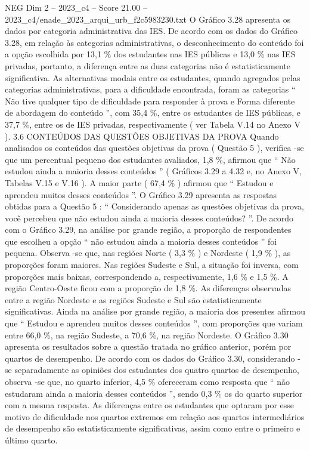 \begin{textsample}{NEG Dim 2 – 2023\_c4 – Score 21.00 – 2023\_c4/enade\_2023\_arqui\_urb\_f2c5983230.txt}
O Gráfico 3.28 apresenta os dados por categoria administrativa das IES.
De acordo com os dados do Gráfico 3.28, em relação às categorias administrativas, o desconhecimento do conteúdo foi a opção escolhida por 13,1 \% dos estudantes nas IES públicas e 13,0 \% nas IES privadas, portanto, a diferença entre as duas categorias não é estatisticamente significativa.
As alternativas modais entre os estudantes, quando agregados pelas categorias administrativas, para a dificuldade encontrada, foram as categorias “ Não tive qualquer tipo de dificuldade para responder à prova e Forma diferente de abordagem do conteúdo ”, com 35,4 \%, entre os estudantes de IES públicas, e 37,7 \%, entre os de IES privadas, respectivamente ( ver Tabela V.14 no Anexo V ). 3.6 CONTEÚDOS DAS QUESTÕES OBJETIVAS DA PROVA Quando analisados os conteúdos das questões objetivas da prova ( Questão 5 ), verifica -se que um percentual pequeno dos estudantes avaliados, 1,8 \%, afirmou que “ Não estudou ainda a maioria desses conteúdos ” ( Gráficos 3.29 a 4.32 e, no Anexo V, Tabelas V.15 e V.16 ).
A maior parte ( 67,4 \% ) afirmou que “ Estudou e aprendeu muitos desses conteúdos ”.
O Gráfico 3.29 apresenta as respostas obtidas para a Questão 5 : “ Considerando apenas as questões objetivas da prova, você percebeu que não estudou ainda a maioria desses conteúdos? ”.
De acordo com o Gráfico 3.29, na análise por grande região, a proporção de respondentes que escolheu a opção “ não estudou ainda a maioria desses conteúdos ” foi pequena.
Observa -se que, nas regiões Norte ( 3,3 \% ) e Nordeste ( 1,9 \% ), as proporções foram maiores.
Nas regiões Sudeste e Sul, a situação foi inversa, com proporções mais baixas, correspondendo a, respectivamente, 1,6 \% e 1,5 \%.
A região Centro-Oeste ficou com a proporção de 1,8 \%.
As diferenças observadas entre a região Nordeste e as regiões Sudeste e Sul são estatisticamente significativas.
Ainda na análise por grande região, a maioria dos presentes afirmou que “ Estudou e aprendeu muitos desses conteúdos ”, com proporções que variam entre 66,0 \%, na região Sudeste, a 70,6 \%, na região Nordeste.
O Gráfico 3.30 apresenta os resultados sobre a questão tratada no gráfico anterior, porém por quartos de desempenho.
De acordo com os dados do Gráfico 3.30, considerando -se separadamente as opiniões dos estudantes dos quatro quartos de desempenho, observa -se que, no quarto inferior, 4,5 \% ofereceram como resposta que “ não estudaram ainda a maioria desses conteúdos ”, sendo 0,3 \% os do quarto superior com a mesma resposta.
As diferenças entre os estudantes que optaram por esse motivo de dificuldade nos quartos extremos em relação aos quartos intermediários de desempenho são estatisticamente significativas, assim como entre o primeiro e último quarto.

\end{textsample}
